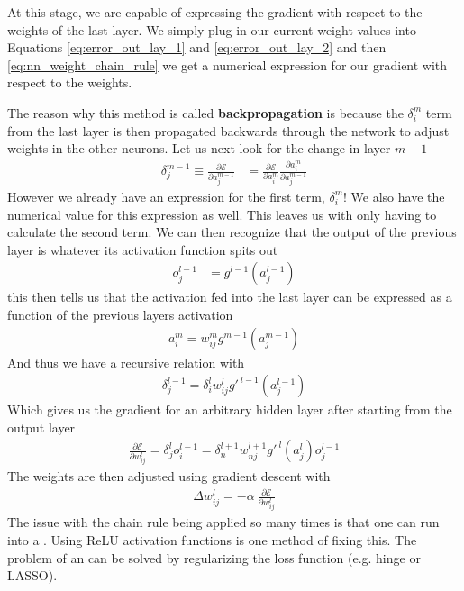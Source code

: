 At this stage, we are capable of expressing the gradient with respect to the weights of the last layer. We simply plug in our current weight values into Equations \ref{eq:error_out_lay_1} and \ref{eq:error_out_lay_2} and then \ref{eq:nn_weight_chain_rule} we get a numerical expression for our gradient with respect to the weights. 



The reason why this method is called \textbf{backpropagation} is because the $\delta_i^m$ term from the last layer is then propagated backwards through the network to adjust weights in the other neurons. Let us next look for the change in layer $m-1$
\begin{align}
	\delta_j^{m-1} \equiv \frac{\partial \mathcal{E}}{\partial a_{j}^{m-1}} &= \frac{\partial \mathcal{E}}{\partial a_{i}^{m}}\frac{\partial a_{i}^{m}}{\partial a_{j}^{m-1}}
\end{align}
However we already have an expression for the first term, $\delta_i^m$! We also have the numerical value for this expression as well. This leaves us with only having to calculate the second term.
We can then recognize that the output of the previous layer is whatever its activation function spits out
\begin{align}
	o_j^{l-1} &= g^{l-1}(a_j^{l-1})
\end{align}
this then tells us that the activation fed into the last layer can be expressed as a function of the previous layers activation
\begin{align}
	a_i^m = w_{ij}^m g^{m-1}(a_j^{m-1})
\end{align}
And thus we have a recursive relation with
\begin{align}
	\delta_j^{l-1} = \delta_i^l w_{ij}^l g'^{~l-1}(a_j^{l-1})
\end{align}
Which gives us the gradient for an arbitrary hidden layer  after starting from the output layer
\begin{align}
	\frac{\partial \mathcal{E}}{\partial w_{ij}^l} = \delta_j^{l}o_i^{l-1} = \delta_n^{l+1} w_{nj}^{l+1} g'^{~l}(a_j^{l})o_j^{l-1}
\end{align}
The weights are then adjusted using gradient descent with
\begin{align}
	\Delta w_{ij}^l = -\alpha~  \frac{\partial \mathcal{E}}{\partial w_{ij}^l}
\end{align}
The issue with the chain rule being applied so many times is that one can run into a . Using ReLU activation functions is one method of fixing this. The problem of an   can be solved by regularizing the loss function (e.g. hinge or LASSO).

